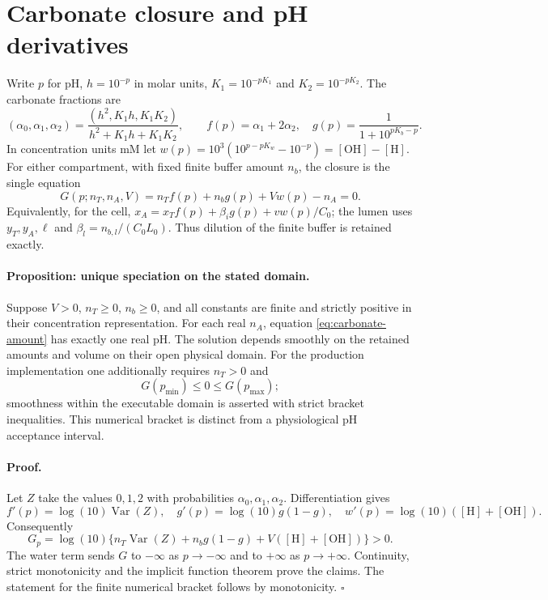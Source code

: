 \section{Carbonate closure and pH derivatives}
\label{sec:carbonate-proof}
Write $p$ for pH, $h=10^{-p}$ in molar units,
$K_1=10^{-pK_1}$ and $K_2=10^{-pK_2}$.  The carbonate fractions are
\[
 (\alpha_0,\alpha_1,\alpha_2)=
 \frac{(h^2,K_1h,K_1K_2)}{h^2+K_1h+K_1K_2},\qquad
 f(p)=\alpha_1+2\alpha_2,\quad
 g(p)=\frac1{1+10^{pK_b-p}}.
\]
In concentration units mM let
$w(p)=10^3(10^{p-pK_w}-10^{-p})=[\mathrm{OH}]-[\mathrm H]$.
For either compartment, with fixed finite buffer amount $n_b$, the closure
is the single equation
\begin{equation}
 G(p;n_T,n_A,V)=n_Tf(p)+n_bg(p)+Vw(p)-n_A=0.
 \label{eq:carbonate-amount}
\end{equation}
Equivalently, for the cell,
$x_A=x_Tf(p)+\beta_i g(p)+v w(p)/C_0$; the lumen uses $y_T,y_A,\ell$
and $\beta_l=n_{b,l}/(C_0L_0)$.  Thus dilution of the finite buffer is
retained exactly.

\paragraph{Proposition: unique speciation on the stated domain.}
Suppose $V>0$, $n_T\geq0$, $n_b\geq0$, and all constants are finite and
strictly positive in their concentration representation.  For each real
$n_A$, equation \eqref{eq:carbonate-amount} has exactly one real pH.
The solution depends smoothly on the retained amounts and volume on their
open physical domain.  For the production implementation one additionally
requires $n_T>0$ and
\[
 G(p_{\min})\leq0\leq G(p_{\max});
\]
smoothness within the executable domain is asserted with strict bracket
inequalities.  This numerical bracket is distinct from a physiological
pH acceptance interval.

\paragraph{Proof.}
Let $Z$ take the values $0,1,2$ with probabilities
$\alpha_0,\alpha_1,\alpha_2$.  Differentiation gives
\[
 f'(p)=\log(10)\operatorname{Var}(Z),\quad
 g'(p)=\log(10)g(1-g),\quad
 w'(p)=\log(10)([\mathrm H]+[\mathrm{OH}]).
\]
Consequently
\begin{equation}
 G_p=\log(10)\{n_T\operatorname{Var}(Z)+n_bg(1-g)
                  +V([\mathrm H]+[\mathrm{OH}])\}>0.
 \label{eq:carbonate-positive}
\end{equation}
The water term sends $G$ to $-\infty$ as $p\to-\infty$ and to
$+\infty$ as $p\to+\infty$.  Continuity, strict monotonicity and the
implicit function theorem prove the claims.  The statement for the
finite numerical bracket follows by monotonicity. $\square$

